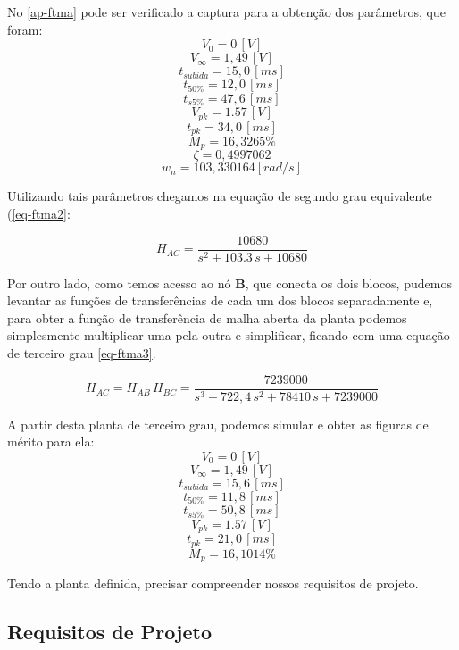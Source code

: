 \documentclass[
	12pt,				%
	article,			%
	openright,			%
	oneside,
	a4paper,			%
	chapter=TITLE,		%
	section=TITLE,		%
	english,			%
	french,				%
	spanish,			%
	brazil,				%
]{abntex2}
\begin{document}
            No \ref{ap-ftma} pode ser verificado a captura para a obtenção dos parâmetros, que foram:
            \FloatBarrier
                $$V_{0}=0\,[V]$$
                $$V_{\infty}=1,49\,[V]$$
                $$t_{subida}=15,0\,[ms]$$
                $$t_{50\%}=12,0\,[ms]$$
                $$t_{s5\%}=47,6\,[ms]$$
                $$V_{pk}=1.57\,[V]$$
                $$t_{pk}=34,0\,[ms]$$
                $$M_{p}=16,3265\%$$
                $$\zeta = 0,4997062 $$
                $$w_n = 103,330164 [rad/s]$$
            \FloatBarrier
            
            Utilizando tais parâmetros chegamos na equação de segundo grau equivalente (\autoref{eq-ftma2}:
            
            \begin{equation}
                \label{eq-ftma2}
                H_{AC} = \frac{10680}{s^2 +103.3\,s + 10680}
            \end{equation}
            
            Por outro lado, como temos acesso ao nó \textbf{B}, que conecta os dois blocos, pudemos levantar as funções de transferências de cada um dos blocos separadamente e, para obter a função de transferência de malha aberta da planta podemos simplesmente multiplicar uma pela outra e simplificar, ficando com uma equação de terceiro grau \autoref{eq-ftma3}.
        
            \begin{equation}
                \label{eq-ftma3}
                H_{AC} = H_{AB}\,H_{BC} = \frac{7239000}{s^3 +722,4\,s^2 +78410\,s +7239000}
            \end{equation}
            
            A partir desta planta de terceiro grau, podemos simular e obter as figuras de mérito para ela:
            \FloatBarrier
                $$V_{0}=0\,[V]$$
                $$V_{\infty}=1,49\,[V]$$
                $$t_{subida}=15,6\,[ms]$$
                $$t_{50\%}=11,8\,[ms]$$
                $$t_{s5\%}=50,8\,[ms]$$
                $$V_{pk}=1.57\,[V]$$
                $$t_{pk}=21,0\,[ms]$$
                $$M_{p}=16,1014\%$$
            \FloatBarrier
        
            Tendo a planta definida, precisar compreender nossos requisitos de projeto.
        
        \subsection{Requisitos de Projeto}
        
\end{document}
